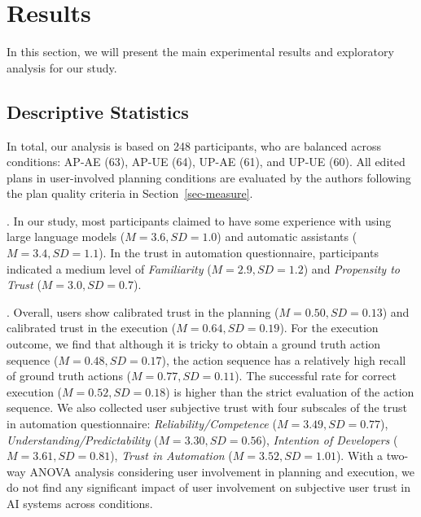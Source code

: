 \section{Results} 
In this section, we will present the main experimental results and exploratory analysis for our study. %

\subsection{Descriptive Statistics}

In total, our analysis is based on 248 participants, who are balanced across conditions: AP-AE (63), AP-UE (64), UP-AE (61), and UP-UE (60). 
All edited plans in user-involved planning conditions are evaluated by the authors following the plan quality criteria  in Section~\ref{sec-measure}. 

. In our study, most participants claimed to have some experience with using large language models ($M=3.6, SD=1.0$) and automatic assistants ($M=3.4, SD=1.1$). In the trust in automation questionnaire, participants indicated a medium level of \textit{Familiarity} ($M=2.9, SD=1.2$) and \textit{Propensity to Trust} ($M=3.0, SD=0.7$).

. Overall, users show calibrated trust in the planning ($M= 0.50, SD=0.13$) and calibrated trust in the execution ($M=0.64, SD=0.19$). 
For the execution outcome, we find that although it is tricky to obtain a ground truth action sequence ($M=0.48, SD=0.17$), the action sequence has a relatively high recall of ground truth actions ($M=0.77, SD=0.11$). %
The successful rate for correct execution ($M=0.52, SD=0.18$) is higher than the strict evaluation of the action sequence. 
We also collected user subjective trust with four subscales of the trust in automation questionnaire: \textit{Reliability/Competence} ($M=3.49, SD=0.77$),  \textit{Understanding/Predictability} ($M=3.30, SD=0.56$),  \textit{Intention of Developers} ($M=3.61, SD=0.81$),  \textit{Trust in Automation} ($M=3.52, SD=1.01$). 
With a two-way ANOVA analysis considering user involvement in planning and execution, we do not find any significant impact of user involvement on subjective user trust in AI systems across conditions.

